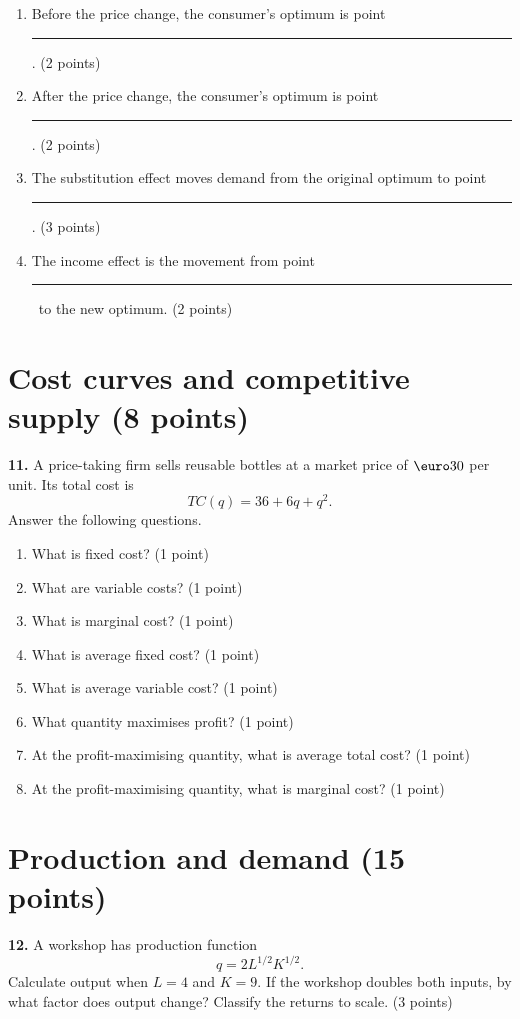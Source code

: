 \documentclass[11pt,a4paper]{article}
\newcommand{\shortblank}{\rule{0.17\textwidth}{0.35pt}}
\begin{document}
\begin{enumerate}[label=\textbf{\arabic*.},start=7]
  \item Before the price change, the consumer's optimum is point
        \shortblank. \hfill (2 points)
  \item After the price change, the consumer's optimum is point
        \shortblank. \hfill (2 points)
  \item The substitution effect moves demand from the original optimum to
        point \shortblank. \hfill (3 points)
  \item The income effect is the movement from point \shortblank\ to the new
        optimum. \hfill (2 points)
\end{enumerate}

\vfill
\newpage
\section{Cost curves and competitive supply \hfill (8 points)}

\textbf{11.} A price-taking firm sells reusable bottles at a market price of
\(\text{\euro}30\) per unit. Its total cost is
\[
TC(q)=36+6q+q^2.
\]
Answer the following questions.

\begin{enumerate}[label=\textbf{\alph*.}]
  \item What is fixed cost? \hfill (1 point)
  \item What are variable costs? \hfill (1 point)
  \item What is marginal cost? \hfill (1 point)
  \item What is average fixed cost? \hfill (1 point)
  \item What is average variable cost? \hfill (1 point)
  \item What quantity maximises profit? \hfill (1 point)
  \item At the profit-maximising quantity, what is average total cost?
        \hfill (1 point)
  \item At the profit-maximising quantity, what is marginal cost?
        \hfill (1 point)
\end{enumerate}

\vfill
\newpage
\section{Production and demand \hfill (15 points)}

\textbf{12.} A workshop has production function
\[
q=2L^{1/2}K^{1/2}.
\]
Calculate output when \(L=4\) and \(K=9\). If the workshop doubles both
inputs, by what factor does output change? Classify the returns to scale.
\hfill (3 points)
\end{document}
